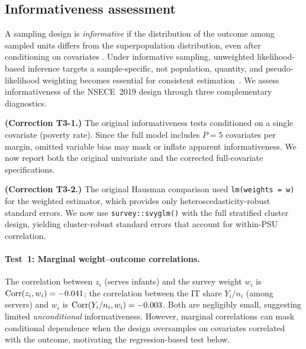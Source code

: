 
\subsection{Informativeness assessment}
\label{smd:informativeness}

A sampling design is \emph{informative} if the distribution of the
outcome among sampled units differs from the superpopulation
distribution, even after conditioning on covariates
\citep{Pfeffermann1993}.  Under informative sampling, unweighted
likelihood-based inference targets a sample-specific, not population,
quantity, and pseudo-likelihood weighting becomes essential for
consistent estimation~\citep{SavitskyToth2016}.  We assess
informativeness of the NSECE~2019 design through three complementary
diagnostics.

{\upshape\textbf{(Correction T3-1.)}}
The original informativeness tests conditioned on a single covariate
(poverty rate).  Since the full model includes $P = 5$ covariates per
margin, omitted variable bias may mask or inflate apparent
informativeness.  We now report both the original univariate and the
corrected full-covariate specifications.

{\upshape\textbf{(Correction T3-2.)}}
The original Hausman comparison used \texttt{lm(weights = w)} for the
weighted estimator, which provides only heteroscedasticity-robust
standard errors.  We now use \texttt{survey::svyglm()} with the full
stratified cluster design, yielding cluster-robust standard errors
that account for within-PSU correlation.

\paragraph{Test~1: Marginal weight--outcome correlations.}
The correlation between $z_i$ (serves infants) and the survey weight
$w_i$ is $\operatorname{Corr}(z_i, w_i) = -0.041$; the correlation between
the IT share $Y_i / n_i$ (among servers) and $w_i$ is
$\operatorname{Corr}(Y_i/n_i, w_i) = -0.003$.  Both are negligibly small,
suggesting limited \emph{unconditional} informativeness.  However,
marginal correlations can mask conditional dependence when the design
oversamples on covariates correlated with the outcome, motivating the
regression-based test below.

